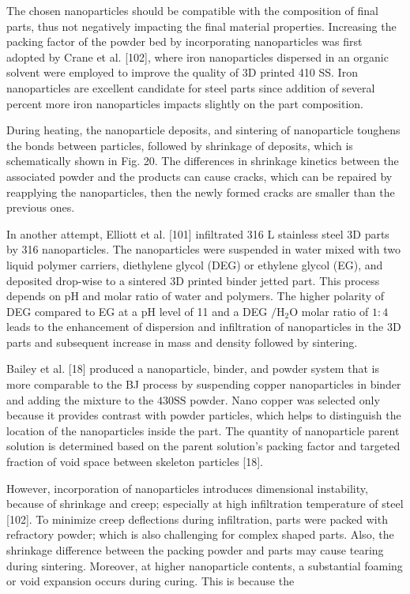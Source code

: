 \documentclass[10pt]{article}
\begin{document}
The chosen nanoparticles should be compatible with the composition of final parts, thus not negatively impacting the final material properties. Increasing the packing factor of the powder bed by incorporating nanoparticles was first adopted by Crane et al. [102], where iron nanoparticles dispersed in an organic solvent were employed to improve the quality of 3D printed 410 SS. Iron nanoparticles are excellent candidate for steel parts since addition of several percent more iron nanoparticles impacts slightly on the part composition.

During heating, the nanoparticle deposits, and sintering of nanoparticle toughens the bonds between particles, followed by shrinkage of deposits, which is schematically shown in Fig. 20. The differences in shrinkage kinetics between the associated powder and the products can cause cracks, which can be repaired by reapplying the nanoparticles, then the newly formed cracks are smaller than the previous ones.

In another attempt, Elliott et al. [101] infiltrated 316 L stainless steel 3D parts by 316 nanoparticles. The nanoparticles were suspended in water mixed with two liquid polymer carriers, diethylene glycol (DEG) or ethylene glycol (EG), and deposited drop-wise to a sintered 3D printed binder jetted part. This process depends on $\mathrm{pH}$ and molar ratio of water and polymers. The higher polarity of DEG compared to EG at a $\mathrm{pH}$ level of 11 and a DEG $/ \mathrm{H}_{2} \mathrm{O}$ molar ratio of $1: 4$ leads to the enhancement of dispersion and infiltration of nanoparticles in the 3D parts and subsequent increase in mass and density followed by sintering.

Bailey et al. [18] produced a nanoparticle, binder, and powder system that is more comparable to the BJ process by suspending copper nanoparticles in binder and adding the mixture to the $430 \mathrm{SS}$ powder. Nano copper was selected only because it provides contrast with powder particles, which helps to distinguish the location of the nanoparticles inside the part. The quantity of nanoparticle parent solution is determined based on the parent solution's packing factor and targeted fraction of void space between skeleton particles [18].

However, incorporation of nanoparticles introduces dimensional instability, because of shrinkage and creep; especially at high infiltration temperature of steel [102]. To minimize creep deflections during infiltration, parts were packed with refractory powder; which is also challenging for complex shaped parts. Also, the shrinkage difference between the packing powder and parts may cause tearing during sintering. Moreover, at higher nanoparticle contents, a substantial foaming or void expansion occurs during curing. This is because the
\end{document}
